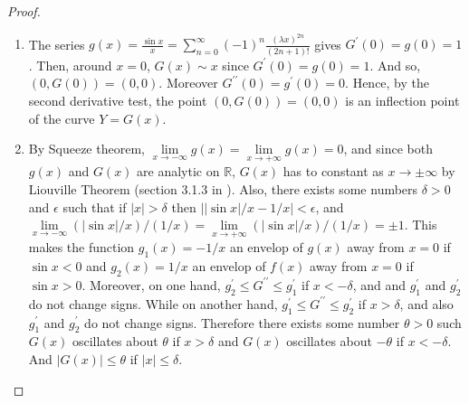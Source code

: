 \documentclass[smallextended]{svjour3}
\begin{document}
\begin{proof}
\begin{enumerate}
\item 
 The series $g(x)=\frac{\sin{x}}{x}=\sum\limits_{n=0}^{\infty}(-1)^n\frac{(\lambda x)^{2n}}{(2n+1)!}$ gives $G^\prime(0)=g(0)=1$. Then, around $x=0$, $G(x)\sim x$ since $G^\prime(0)=g(0)=1$. And so, $(0,G(0))=(0,0)$. Moreover $G^{\prime\prime}(0)=g^\prime(0)=0$. Hence, by the second derivative test, the point $(0,G(0))=(0,0)$ is an inflection point of the curve $Y=G(x)$.

\item By Squeeze theorem, $\lim\limits_{x\rightarrow-\infty}g(x)=\lim\limits_{x\rightarrow+\infty}g(x)=0$, and since both $g(x)$ and $G(x)$ are analytic on $\mathbb{R}$, $G(x)$ has to constant as $x\rightarrow\pm\infty$ by Liouville Theorem (section 3.1.3 in \cite{K}). Also,
    there exists some numbers $\delta>0$ and $\epsilon$ such that if $|x|>\delta$ then $||\sin{x}|/x-{1}/{x}|<\epsilon$, and $\lim\limits_{x\rightarrow-\infty}(|\sin{x}|/x)/({1}/{x})=\lim\limits_{x\rightarrow+\infty}(|\sin{x}|/x)/({1}/{x})=\pm1$.
    This makes the function $g_1(x)=-{1}/{x}$ an envelop of $g(x)$ away from $x=0$ if $\sin{x}<0$ and $g_2(x)={1}/{x}$ an envelop of $f(x)$ away from $x=0$ if $\sin{x}>0$. Moreover, on one hand, $g_2^\prime\le G^{\prime\prime}\le g_1^\prime$ if $x<-\delta$, and and $g_1^\prime$ and $g_2^\prime$ do not change signs. While on another hand, $g_1^\prime\le G^{\prime\prime}\le g_2^\prime$ if $x>\delta$, and also $g_1^\prime$ and $g_2^\prime$ do not change signs. Therefore there exists some number $\theta>0$ such $G(x)$ oscillates about $\theta$ if $x>\delta$ and $G(x)$ oscillates about $-\theta$ if $x<-\delta$. And $|G(x)|\le\theta$ if $|x|\le\delta$.
\end{enumerate}
\end{proof}
\end{document}
